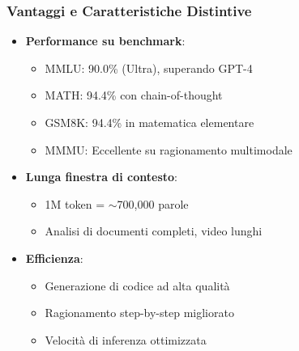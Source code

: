 \documentclass[aspectratio=169]{beamer}
\begin{document}
%
%
\begin{frame}
\frametitle{Vantaggi e Caratteristiche Distintive}
\begin{itemize}
    \item \textbf{Performance su benchmark}:
    \begin{itemize}
        \item MMLU: 90.0\% (Ultra), superando GPT-4
        \item MATH: 94.4\% con chain-of-thought
        \item GSM8K: 94.4\% in matematica elementare
        \item MMMU: Eccellente su ragionamento multimodale
    \end{itemize}
    \item \textbf{Lunga finestra di contesto}:
    \begin{itemize}
        \item 1M token = $\sim$700,000 parole
        \item Analisi di documenti completi, video lunghi
    \end{itemize}
    \item \textbf{Efficienza}:
    \begin{itemize}
        \item Generazione di codice ad alta qualità
        \item Ragionamento step-by-step migliorato
        \item Velocità di inferenza ottimizzata
    \end{itemize}
\end{itemize}
\end{frame}
%
%
\end{document}

